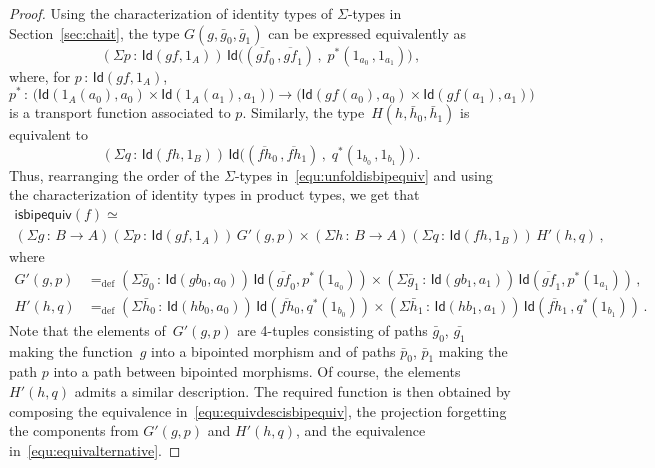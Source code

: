 \documentclass[10pt,a4paper,oneside,reqno]{amsart}
\numberwithin{equation}{section}
\theoremstyle{mythm}
\theoremstyle{mydef}
\theoremstyle{myrmk}
\newcommand{\defeq}{=_{\mathrm{def}}}
\newcommand{\co}{\,{:}\,}
\newcommand{\Id}{\mathsf{Id}}
\newcommand{\isbipequiv}{\mathsf{isbipequiv}}
\begin{document}
\begin{proof}
Using the characterization of identity types of $\Sigma$-types in Section~\ref{sec:chait}, the type $G(g,\bar{g}_0,\bar{g}_1)$ can be  expressed equivalently as
\[
(\Sigma p \co  \Id( g f, 1_A)) \, 
\Id 
\big(  
( 
\overline{gf}_0  \, ,    \overline{gf}_1 
) \, ,  \; 
 p^*
 ( 
 1_{a_0} \, , 1_{a_1}  
 )  
 \big) \, ,
\]
where, for $p \co \Id(gf, 1_A)$, 
\[
p^* \co \big(  \Id( 1_A(a_0), a_0) \times \Id(1_A(a_1), a_1) \big) \to  \big( \Id( gf(a_0), a_0) \times \Id( gf(a_1), a_1)  \big)
\]
is a transport function associated to $p$. Similarly, the type~$H(h, \bar{h}_0, \bar{h}_1)$ is equivalent to 
\[
(\Sigma q \co  \Id( f h, 1_B)) \, 
\Id 
\big(  
( 
\overline{fh}_0  \, ,    \overline{fh}_1 
) \, ,  \; 
 q^*
 ( 
 1_{b_0} \, , 1_{b_1}  
 )  
 \big) \, .
\]
Thus, rearranging the order of the $\Sigma$-types in~\eqref{equ:unfoldisbipequiv} and using the
characterization of identity types in product types, we get that 
\begin{multline}
\label{equ:equivdescisbipequiv}
\isbipequiv(f) \simeq  \\ (\Sigma g \co B \to A)(\Sigma p \co \Id(gf, 1_A))\,  G'(g,p) \times
(\Sigma h \co B \to A)(\Sigma q \co \Id(fh, 1_B))\, H'(h,q) \, , 
\end{multline}
where 
\begin{align} 
G'(g,p) & \defeq 
(\Sigma \bar{g}_0 \co \Id( g b_0, a_0)) \, \Id( \overline{gf}_0, p^*(1_{a_0}) ) \times 
(\Sigma  \bar{g}_1 \co \Id( g b_1, a_1)) \, \Id( \overline{gf}_1, p^*(1_{a_1}) ) \, ,
 \label{equ:bipgp} \\
 H'(h,q) & \defeq 
 (\Sigma \bar{h}_0 \co \Id ( h b_0,  a_0)) \, \Id ( \overline{fh}_0 , q^*(1_{b_0})) \times 
 (\Sigma \bar{h}_1 \co  \Id ( h b_1,  a_1)) \, \Id (   \overline{fh}_1 \, ,  q^*(1_{b_1})) \, .  \label{equ:biphq}
 \end{align} 
 Note that the elements of~$G'(g,p)$ are 4-tuples consisting of paths $\bar{g}_0$, $\bar{g_1}$ making the function~$g$ into a bipointed morphism and of paths $\bar{p}_0$, $\bar{p}_1$ making the path $p$ into a path between
bipointed morphisms. Of course, the elements $H'(h,q)$ admits a similar description. 
The required  function  is then obtained 
by composing the equivalence in~\eqref{equ:equivdescisbipequiv}, the projection 
forgetting the components from $G'(g,p)$ and $H'(h,q)$, and the equivalence in~\eqref{equ:equivalternative}.
\end{proof} 
\end{document}
